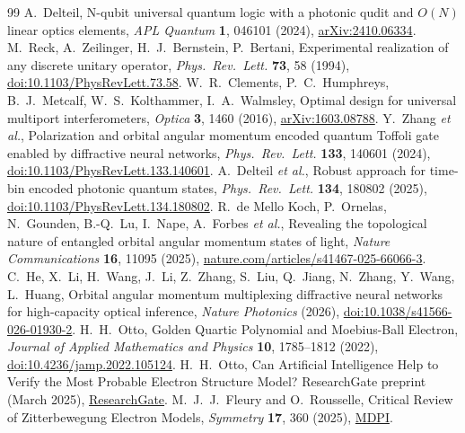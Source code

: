\documentclass[11pt]{article}
\begin{document}
\begin{thebibliography}{99}
 A.~Delteil,
  N-qubit universal quantum logic with a photonic qudit and \(O(N)\)
  linear optics elements, \emph{APL Quantum} \textbf{1}, 046101 (2024),
  \href{https://arxiv.org/abs/2410.06334}{arXiv:2410.06334}.
 M.~Reck, A.~Zeilinger, H.~J.~Bernstein, P.~Bertani,
  Experimental realization of any discrete unitary operator,
  \emph{Phys.\ Rev.\ Lett.} \textbf{73}, 58 (1994),
  \href{https://doi.org/10.1103/PhysRevLett.73.58}{doi:10.1103/PhysRevLett.73.58}.
 W.~R.~Clements, P.~C.~Humphreys,
  B.~J.~Metcalf, W.~S.~Kolthammer, I.~A.~Walmsley,
  Optimal design for universal multiport interferometers,
  \emph{Optica} \textbf{3}, 1460 (2016),
  \href{https://arxiv.org/abs/1603.08788}{arXiv:1603.08788}.
 Y.~Zhang \emph{et al.},
  Polarization and orbital angular momentum encoded quantum Toffoli gate
  enabled by diffractive neural networks,
  \emph{Phys.\ Rev.\ Lett.} \textbf{133}, 140601 (2024),
  \href{https://doi.org/10.1103/PhysRevLett.133.140601}{doi:10.1103/PhysRevLett.133.140601}.
 A.~Delteil \emph{et al.},
  Robust approach for time-bin encoded photonic quantum states,
  \emph{Phys.\ Rev.\ Lett.} \textbf{134}, 180802 (2025),
  \href{https://doi.org/10.1103/PhysRevLett.134.180802}{doi:10.1103/PhysRevLett.134.180802}.
 R.~de Mello Koch, P.~Ornelas,
  N.~Gounden, B.-Q.~Lu, I.~Nape, A.~Forbes \emph{et al.},
  Revealing the topological nature of entangled orbital angular momentum
  states of light,
  \emph{Nature Communications} \textbf{16}, 11095 (2025),
  \href{https://www.nature.com/articles/s41467-025-66066-3}{nature.com/articles/s41467-025-66066-3}.
 C.~He, X.~Li, H.~Wang,
  J.~Li, Z.~Zhang, S.~Liu, Q.~Jiang, N.~Zhang, Y.~Wang, L.~Huang,
  Orbital angular momentum multiplexing diffractive neural networks for
  high-capacity optical inference,
  \emph{Nature Photonics} (2026),
  \href{https://doi.org/10.1038/s41566-026-01930-2}{doi:10.1038/s41566-026-01930-2}.
 H.~H.~Otto,
  Golden Quartic Polynomial and Moebius-Ball Electron,
  \emph{Journal of Applied Mathematics and Physics} \textbf{10},
  1785--1812 (2022),
  \href{https://doi.org/10.4236/jamp.2022.105124}{doi:10.4236/jamp.2022.105124}.
 H.~H.~Otto,
  Can Artificial Intelligence Help to Verify the Most Probable Electron
  Structure Model? ResearchGate preprint (March 2025),
  \href{https://www.researchgate.net/publication/389905106_Can_Artificial_Intelligence_Help_to_Verify_the_Most_Probable_Electron_Structure_Model}{ResearchGate}.
 M.~J.~J.~Fleury and O.~Rousselle,
  Critical Review of Zitterbewegung Electron Models,
  \emph{Symmetry} \textbf{17}, 360 (2025),
  \href{https://www.mdpi.com/2073-8994/17/3/360}{MDPI}.
\end{thebibliography}
\end{document}
